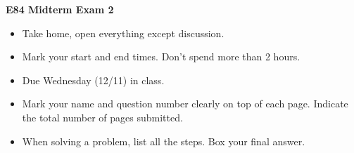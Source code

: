 \usepackage{html}

\begin{center}
{\Large \bf E84 Midterm Exam 2}
\end{center}

\begin{itemize}
\item Take home, open everything except discussion.
\item Mark your start and end times. Don't spend more than 2 hours.
\item Due Wednesday (12/11) in class.
\item Mark your name and question number clearly on top of each page.
  Indicate the total number of pages submitted.
\item When solving a problem, list all the steps. Box your final answer.
\end{itemize}

